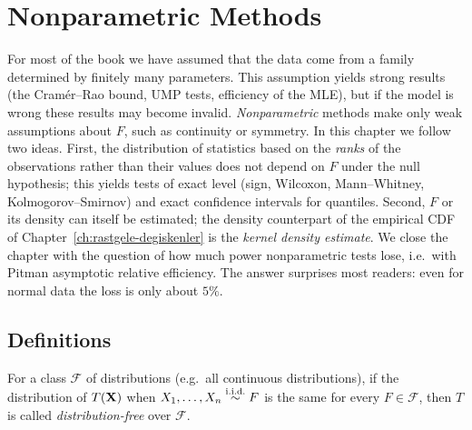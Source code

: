 \documentclass[main.tex]{subfiles}
\begin{document}
\chapter{Nonparametric Methods}\label{ch:parametrik-olmayan}

For most of the book we have assumed that the data come from a family determined by finitely many parameters. This assumption yields strong results (the Cramér--Rao bound, UMP tests, efficiency of the MLE), but if the model is wrong these results may become invalid. \emph{Nonparametric} methods make only weak assumptions about $F$, such as continuity or symmetry. In this chapter we follow two ideas. First, the distribution of statistics based on the \emph{ranks} of the observations rather than their values does not depend on $F$ under the null hypothesis; this yields tests of exact level (sign, Wilcoxon, Mann--Whitney, Kolmogorov--Smirnov) and exact confidence intervals for quantiles. Second, $F$ or its density can itself be estimated; the density counterpart of the empirical CDF of Chapter~\ref{ch:rastgele-degiskenler} is the \emph{kernel density estimate}. We close the chapter with the question of how much power nonparametric tests lose, i.e.\ with Pitman asymptotic relative efficiency. The answer surprises most readers: even for normal data the loss is only about $5\%$.

\section{Definitions}

\begin{definition}\label{def:dagilimdan-bagimsiz}
For a class $\mathcal F$ of distributions (e.g.\ all continuous distributions), if the distribution of $T(\mathbf{X})$ when $X_1,\dots,X_n\overset{\text{i.i.d.}}{\sim} F$ is the same for every $F\in\mathcal F$, then $T$ is called \emph{distribution-free} over $\mathcal F$.
\end{definition}
\end{document}
